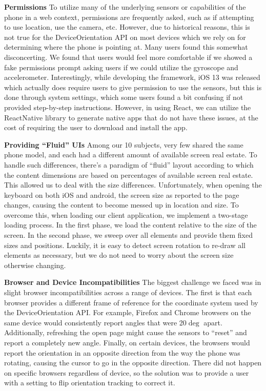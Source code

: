 \textbf{Permissions} To utilize many of the underlying sensors or capabilities of the
phone in a web context, permissions are frequently asked, such
as if attempting to use location, use the camera, etc. However,
due to historical reasons, this is not true for the DeviceOrientation
API on most devices which we rely on for determining where the phone
is pointing at. Many users found this somewhat disconcerting. We
found that users would feel more comfortable if we showed a fake
permissions prompt asking users if we could utilize the gyroscope
and accelerometer. Interestingly, while developing the framework,
iOS 13 was released which actually does require users to give
permission to use the sensors, but this is done through system
settings, which some users found a bit confusing if not provided
step-by-step instructions. However, in using React, we can utilize the ReactNative library to generate native apps that do not have these issues, at the cost of requiring the user to download and install the app.

\textbf{Providing ``Fluid'' UIs} Among our 10 subjects, very few shared the same phone model, and each had a different amount of
available screen real estate. To handle such differences,
there's a paradigm of ``fluid'' layout according to which the content dimensions are based on percentages of available screen real estate. This allowed
us to deal with the size differences. Unfortunately, when
opening the keyboard on both iOS and android, the screen size as
reported to the page changes, causing the content to become messed up
in location and size. To overcome this, when loading our client
application, we implement a two-stage loading process. In the
first phase, we load the content relative to the size of the screen.
In the second phase, we sweep over all elements and provide them
fixed sizes and positions. Luckily, it is easy to detect screen
rotation to re-draw all elements as necessary, but we do not need to
worry about the screen size otherwise changing.

\textbf{Browser and Device Incompatibilities} The biggest challenge we faced was in slight browser
incompatibilities across a range of devices. The first is that
each browser provides a different frame of reference for the
coordinate system used by the DeviceOrientation API. For example,
Firefox and Chrome browsers on the same device would consistently
report angles that were 20$\deg$ apart. Additionally, refreshing
the open page might cause the sensors to ``reset'' and report
a completely new angle. Finally, on certain devices, the browsers
would report the orientation in an opposite direction from the way
the phone was rotating, causing the cursor to go in the opposite
direction. There did not happen on specific browsers regardless of
device, so the solution was to provide a user with a setting to
flip orientation tracking to correct it.
